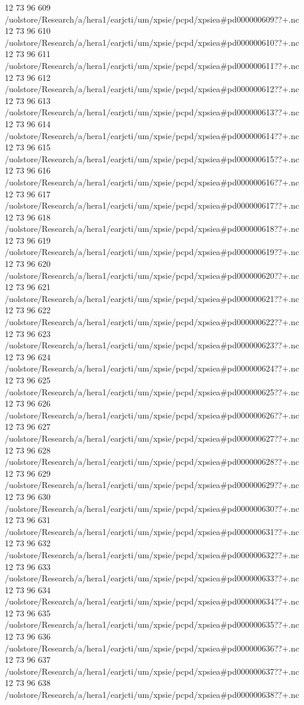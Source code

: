12 73 96
609
/uolstore/Research/a/hera1/earjcti/um/xpsie/pcpd/xpsiea#pd000000609??+.nc
12 73 96
610
/uolstore/Research/a/hera1/earjcti/um/xpsie/pcpd/xpsiea#pd000000610??+.nc
12 73 96
611
/uolstore/Research/a/hera1/earjcti/um/xpsie/pcpd/xpsiea#pd000000611??+.nc
12 73 96
612
/uolstore/Research/a/hera1/earjcti/um/xpsie/pcpd/xpsiea#pd000000612??+.nc
12 73 96
613
/uolstore/Research/a/hera1/earjcti/um/xpsie/pcpd/xpsiea#pd000000613??+.nc
12 73 96
614
/uolstore/Research/a/hera1/earjcti/um/xpsie/pcpd/xpsiea#pd000000614??+.nc
12 73 96
615
/uolstore/Research/a/hera1/earjcti/um/xpsie/pcpd/xpsiea#pd000000615??+.nc
12 73 96
616
/uolstore/Research/a/hera1/earjcti/um/xpsie/pcpd/xpsiea#pd000000616??+.nc
12 73 96
617
/uolstore/Research/a/hera1/earjcti/um/xpsie/pcpd/xpsiea#pd000000617??+.nc
12 73 96
618
/uolstore/Research/a/hera1/earjcti/um/xpsie/pcpd/xpsiea#pd000000618??+.nc
12 73 96
619
/uolstore/Research/a/hera1/earjcti/um/xpsie/pcpd/xpsiea#pd000000619??+.nc
12 73 96
620
/uolstore/Research/a/hera1/earjcti/um/xpsie/pcpd/xpsiea#pd000000620??+.nc
12 73 96
621
/uolstore/Research/a/hera1/earjcti/um/xpsie/pcpd/xpsiea#pd000000621??+.nc
12 73 96
622
/uolstore/Research/a/hera1/earjcti/um/xpsie/pcpd/xpsiea#pd000000622??+.nc
12 73 96
623
/uolstore/Research/a/hera1/earjcti/um/xpsie/pcpd/xpsiea#pd000000623??+.nc
12 73 96
624
/uolstore/Research/a/hera1/earjcti/um/xpsie/pcpd/xpsiea#pd000000624??+.nc
12 73 96
625
/uolstore/Research/a/hera1/earjcti/um/xpsie/pcpd/xpsiea#pd000000625??+.nc
12 73 96
626
/uolstore/Research/a/hera1/earjcti/um/xpsie/pcpd/xpsiea#pd000000626??+.nc
12 73 96
627
/uolstore/Research/a/hera1/earjcti/um/xpsie/pcpd/xpsiea#pd000000627??+.nc
12 73 96
628
/uolstore/Research/a/hera1/earjcti/um/xpsie/pcpd/xpsiea#pd000000628??+.nc
12 73 96
629
/uolstore/Research/a/hera1/earjcti/um/xpsie/pcpd/xpsiea#pd000000629??+.nc
12 73 96
630
/uolstore/Research/a/hera1/earjcti/um/xpsie/pcpd/xpsiea#pd000000630??+.nc
12 73 96
631
/uolstore/Research/a/hera1/earjcti/um/xpsie/pcpd/xpsiea#pd000000631??+.nc
12 73 96
632
/uolstore/Research/a/hera1/earjcti/um/xpsie/pcpd/xpsiea#pd000000632??+.nc
12 73 96
633
/uolstore/Research/a/hera1/earjcti/um/xpsie/pcpd/xpsiea#pd000000633??+.nc
12 73 96
634
/uolstore/Research/a/hera1/earjcti/um/xpsie/pcpd/xpsiea#pd000000634??+.nc
12 73 96
635
/uolstore/Research/a/hera1/earjcti/um/xpsie/pcpd/xpsiea#pd000000635??+.nc
12 73 96
636
/uolstore/Research/a/hera1/earjcti/um/xpsie/pcpd/xpsiea#pd000000636??+.nc
12 73 96
637
/uolstore/Research/a/hera1/earjcti/um/xpsie/pcpd/xpsiea#pd000000637??+.nc
12 73 96
638
/uolstore/Research/a/hera1/earjcti/um/xpsie/pcpd/xpsiea#pd000000638??+.nc
